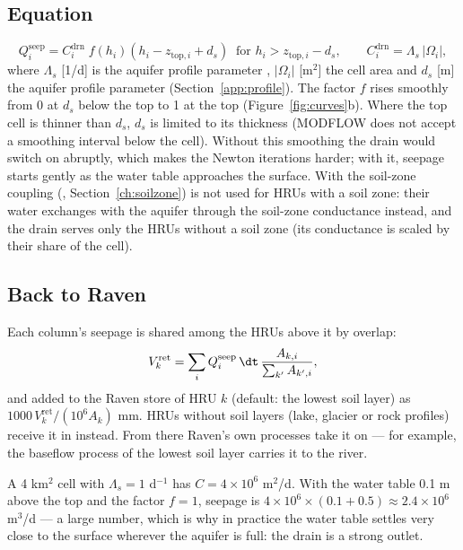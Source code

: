\subsection{Equation}
\begin{equation}
Q^{\mathrm{seep}}_i=C^{\mathrm{drn}}_i\;f\!\left(h_i\right)\left(h_i-z_{\mathrm{top},i}+d_s\right)\ \text{ for } h_i>z_{\mathrm{top},i}-d_s,
\qquad C^{\mathrm{drn}}_i=\Lambda_s\,|\Omega_i| ,
\end{equation}
where $\Lambda_s$ [1/d] is the aquifer profile parameter , $|\Omega_i|$ [m$^2$] the cell area and $d_s$ [m] the aquifer profile parameter  (Section~\ref{app:profile}).
The factor $f$ rises smoothly from 0 at $d_s$ below the top to 1 at the top (Figure~\ref{fig:curves}b). Where the top cell is
thinner than $d_s$, $d_s$ is limited to its thickness (MODFLOW does not accept a smoothing interval below the cell). Without this
smoothing the drain would switch on abruptly, which makes the Newton iterations harder; with it, seepage starts gently
as the water table approaches the surface. With the soil-zone coupling (, Section~\ref{ch:soilzone})
 is not used for HRUs with a soil zone: their water exchanges with the aquifer through the soil-zone
conductance instead, and the drain serves only the HRUs without a soil zone (its conductance is scaled by their share of the cell).

\subsection{Back to Raven}
Each column's seepage is shared among the HRUs above it by overlap:
\begin{equation}
V^{\mathrm{ret}}_k=\sum_i Q^{\mathrm{seep}}_i\,\dt\,\frac{A_{k,i}}{\sum_{k'}A_{k',i}},
\end{equation}
and added to the Raven store  of HRU $k$ (default: the lowest soil layer) as
$1000\,V^{\mathrm{ret}}_k/(10^{6}A_k)$ mm. HRUs without soil layers (lake, glacier or rock profiles) receive it in
 instead. From there Raven's own processes take it on --- for example, the baseflow process of the
lowest soil layer carries it to the river.
\begin{example}[: seepage]
A 4 km$^2$ cell with $\Lambda_s=1$ d$^{-1}$ has $C=4\times10^6$ m$^2$/d. With the water table 0.1 m above the top and the
factor $f=1$, seepage is $4\times10^6\times(0.1+0.5)\approx2.4\times10^6$ m$^3$/d --- a large number, which is why in
practice the water table settles very close to the surface wherever the aquifer is full: the drain is a strong outlet.
\end{example}

